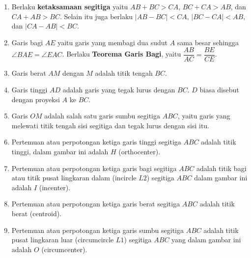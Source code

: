 \documentclass[11pt]{scrartcl}
\begin{document}
\begin{enumerate}
    \item Berlaku \textbf{ketaksamaan segitiga} yaitu $AB+BC>CA$, $BC+CA>AB$, dan $CA+AB>BC$. Selain itu juga berlaku $|AB-BC|<CA$, $|BC-CA|<AB$, dan $|CA-AB|<BC$.
    \item Garis bagi $AE$ yaitu garis yang membagi dua sudut $A$ sama besar sehingga $\angle BAE = \angle EAC$. Berlaku \textbf{Teorema Garis Bagi}, yaitu $\dfrac{AB}{AC}=\dfrac{BE}{CE}$.
    \item Garis berat $AM$ dengan $M$ adalah titik tengah $BC$.
    \item Garis tinggi $AD$ adalah garis yang tegak lurus dengan $BC$. $D$ biasa disebut dengan proyeksi $A$ ke $BC$.
    \item Garis $OM$ adalah salah satu garis sumbu segitiga $ABC$, yaitu garis yang melewati titik tengah sisi segitiga dan tegak lurus dengan sisi itu.
    \item Pertemuan atau perpotongan ketiga garis tinggi segitiga $ABC$ adalah titik tinggi, dalam gambar ini adalah $H$ (orthocenter).
    \item Pertemuan atau perpotongan ketiga garis bagi segitiga $ABC$ adalah titik bagi atau titik pusat lingkaran dalam (incircle $L2$) segitiga $ABC$ dalam gambar ini adalah $I$ (incenter).
    \item Pertemuan atau perpotongan ketiga garis berat segitiga $ABC$ adalah titik berat (centroid).
    \item Pertemuan atau perpotongan ketiga garis sumbu segitiga $ABC$ adalah titik pusat lingkaran luar (circumcircle $L1$) segitiga $ABC$ yang dalam gambar ini adalah $O$ (circumcenter).
\end{enumerate}
\end{document}
